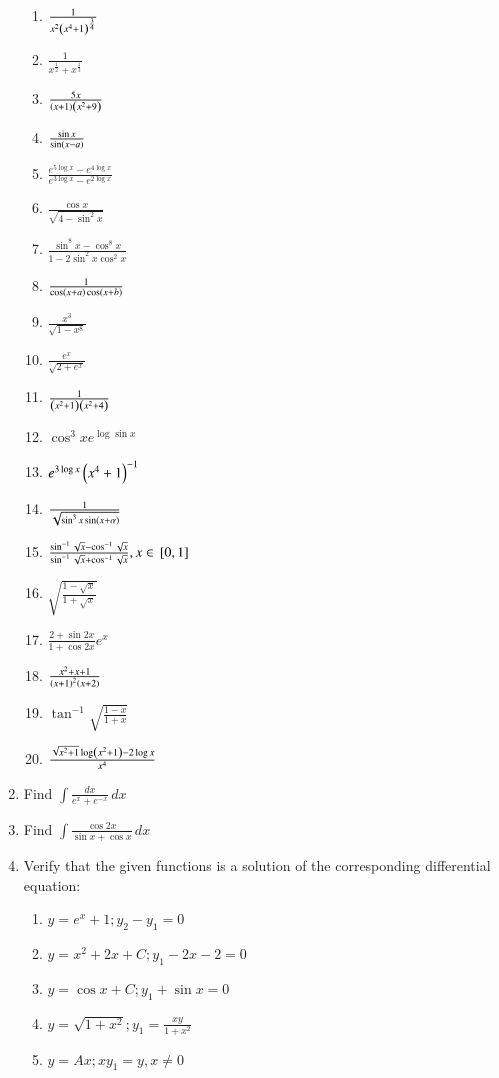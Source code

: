 \begin{enumerate}[label=\arabic*.,ref=\thesubsection.\theenumi]
\begin{enumerate}[label = (\roman*)]
\item $\frac{1}{x^2\left(x^4+1\right)^{\frac{3}{4}}}$
\item $\frac{1}{x^{\frac{1}{2}}+x^{\frac{1}{3}}}$
\item $\frac{5x}{\left(x+1\right)\left(x^2+9\right)}$
\item $\frac{\sin x}{\sin\left(x-a\right)}$
\item $\frac{e^{5\log x}-e^{4\log x}}{e^{3\log x}-e^{2\log x}}$
\item $\frac{\cos x}{\sqrt{4-\sin^2x}}$
\item $\frac{\sin^8 x - \cos^8 x}{1-2\sin^2 x \cos^2 x}$
\item $\frac{1}{\cos\left(x+a\right)\cos\left(x+b\right)}$
\item $\frac{x^3}{\sqrt{1-x^8}}$
\item $\frac{e^x}{\sqrt{2+e^x}}$
\item $\frac{1}{\left(x^2+1\right)\left(x^2+4\right)}$
\item $\cos^3 x  e^{\log \sin x}$
\item $  e^{3\log x}\left(x^4+1\right)^{-1}$
\item $\frac{1}{\sqrt{\sin^{3}x\sin\left(x+\alpha\right)}}$
\item $\frac{\sin^{-1}\sqrt{x} - \cos^{-1} \sqrt{x}}{\sin^{-1}\sqrt{x} + \cos^{-1} \sqrt{x}}, x \in {}\left[0,1\right]$
%
\item $\sqrt{\frac{1-\sqrt{x}}{1+\sqrt{x}}}$
\item $\frac{2+\sin 2x}{1+\cos 2x}e^{x}$
\item $\frac{x^2+x+1}{\left(x+1\right)^2\left(x+2\right)}$
\item $\tan^{-1}\sqrt{\frac{1-x}{1+x}}$
\item $\frac{\sqrt{x^2+1}\log\left(x^2+1\right)-2\log x}{x^4}$
\end{enumerate}
\item Find $\int \frac{dx}{e^x+e^{-x}}\, dx$
\item Find $\int \frac{\cos 2x}{\sin x +\cos x}\, dx$
%
\item Verify that the given functions is a solution of the corresponding differential equation:
\begin{enumerate}[label=(\roman*)]
%
\item  $y = e^x + 1; y_2 - y_1 = 0$
\item  $y = x^2+2x+C;  y_1-2x-2 = 0$
\item  $y = \cos x+C;  y_1 + \sin x = 0$
\item  $y = \sqrt{1+x^2};  y_1 = \frac{xy}{1+x^2}$
\item  $y = Ax; xy_1 = y, x \ne 0$

\end{enumerate}
\end{enumerate}
